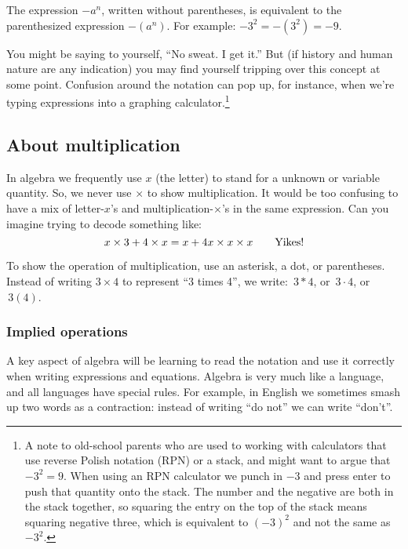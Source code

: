 \begin{boxdef}
The expression $-a^n$, written without parentheses, is equivalent to the parenthesized expression $-(a^n)$. For example: $-3^2 = -(3^2) = -9$.
\end{boxdef}

You might be saying to yourself, ``No sweat. I get it.'' But (if history and human nature are any indication) you may find yourself tripping over this concept at some point. Confusion around the notation can pop up, for instance, when we're typing expressions into a graphing calculator.\footnote{A note to old-school parents who are used to working with calculators that use reverse Polish notation (RPN) or a stack, and might want to argue that $-3^2 = 9$. When using an RPN calculator we punch in $-3$ and press enter to push that quantity onto the stack. The number and the negative are both in the stack together, so squaring the entry on the top of the stack means squaring negative three, which is equivalent to $(-3)^2$ and not the same as $-3^2$.}

\subsection{About multiplication}

In algebra we frequently use $x$ (the letter) to stand for a unknown or variable quantity. So, we never use $\times$ to show multiplication. It would be too confusing to have a mix of letter-$x$'s and multiplication-$\times$'s in the same expression. Can you imagine trying to decode something like: \[x \times 3 + 4 \times x = x + 4 x \times x \times x \text{\qquad Yikes!}\]

\begin{boxwarn}
To show the operation of multiplication, use an asterisk, a dot, or parentheses. Instead of writing $3\times 4$ to represent ``3 times 4'', we write: $\,3 \ast 4$, or $\,3 \cdot 4$, or $\,3(4)$.
\end{boxwarn}

\subsubsection{Implied operations}

A key aspect of algebra will be learning to read the notation and use it correctly when writing expressions and equations. Algebra is very much like a language, and all languages have special rules. For example, in English we sometimes smash up two words as a contraction: instead of writing ``do not'' we can write ``don't''.

